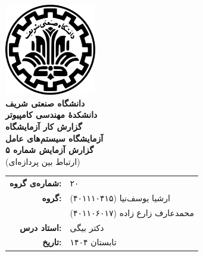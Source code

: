 \documentclass[12pt]{article}
\newcommand{\persianordinal}[1]{%
	\ifcase#1
	\or اول%
	\or دوم%
	\or سوم%
	\or چهارم%
	\or پنجم%
	\or ششم%
	\or هفتم%
	\or هشتم%
	\or نهم%
	\or دهم%
	\or یازدهم%
	\or دوازدهم%
	\or سیزدهم%
	\or چهاردهم%
	\or پانزدهم%
	\or شانزدهم%
	\or هفدهم%
	\or هجدهم%
	\or نوزدهم%
	\or بیستم%
	\else #1\fi
}
\newcommand{\persianordinalpage}{\persianfont\persianordinal{\value{page}}}
\begin{document}
	
	\begin{titlepage}
		\centering
		\vspace*{1cm}
		\includegraphics[width=4cm]{sharif.png}\\[1.5cm]
		{\Large\textbf{دانشگاه صنعتی شریف}}\\[0.5cm]
		{\large\textbf{دانشکده‌ٔ مهندسی کامپیوتر}}\\[1.5cm]
		{\Huge\textbf{گزارش کار آزمایشگاه}}\\[0.5cm]
		{\LARGE\textbf{آزمایشگاه سیستم‌های عامل}}\\[2cm]
		
		\textbf{گزارش آزمایش شماره ۵}\\
		(ارتباط بین پردازه‌ای)
		
		\vfill
		\begin{tabular}{rl}
			\textbf{شماره‌ی گروه:} & ۲۰ \\
			\textbf{گروه:} &
			ارشیا یوسف‌نیا (۴۰۱۱۱۰۴۱۵) \\
			& محمدعارف زارع زاده (۴۰۱۱۰۶۰۱۷) \\
			\textbf{استاد درس:} & دکتر بیگی \\
			\textbf{تاریخ:} & تابستان ۱۴۰۴ \\
		\end{tabular}
	\end{titlepage}
	
	\clearpage
	\setcounter{page}{1}
	\renewcommand{\thepage}{\persianordinalpage}
	
	\tableofcontents
	\clearpage
	\listoffigures
	
	\clearpage
	\setcounter{page}{1}
	\renewcommand{\thepage}{\persianfont\arabic{page}}
	
	
	
\end{document}
